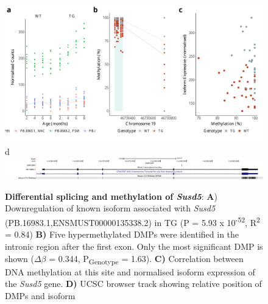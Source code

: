 \begin{figure}[]
	\includegraphics[page=4,scale = 0.4]{Figures/WholeDifferentialAnalysis_DMPDMR.pdf}
	\\
	\hspace*{0.2cm}\vspace{0.5cm}\large d
	\\
	\includegraphics[page=1,trim={1.5cm 0 0 0},scale = 0.9]{Figures/SUSD5_DMP.pdf}
	\captionsetup{width=0.95\textwidth}
	\caption[Differential splicing and methylation of \textit{Susd5}]%
	{\textbf{Differential splicing and methylation of \textit{Susd5}}: \textbf{A}) Downregulation of known isoform associated with \textit{Susd5} (PB.16983.1,ENSMUST00000135338.2) in TG (P = 5.93 x 10\textsuperscript{-52}, R\textsuperscript{2} = 0.84) \textbf{B)} Five hypermethylated DMPs were identified in the intronic region after the first exon. Only the most significant DMP is shown ($\Delta$$\beta$ = 0.344, P\textsubscript{Genotype} = 1.63). \textbf{C)} Correlation between DNA methylation at this site and normalised isoform expression of the \textit{Susd5} gene. \textbf{D)} UCSC browser track showing relative position of DMPs and isoform}    
	\label{fig:IntMeth_Susd5}
\end{figure}

